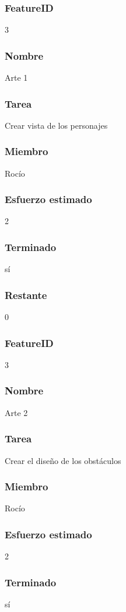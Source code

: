 \subsubsection{FeatureID} 3
\subsubsection{Nombre} Arte 1
\subsubsection{Tarea} Crear vista de los personajes
\subsubsection{Miembro} Rocío
\subsubsection{Esfuerzo estimado} 2
\subsubsection{Terminado} sí
\subsubsection{Restante} 0



\subsubsection{FeatureID} 3
\subsubsection{Nombre} Arte 2
\subsubsection{Tarea} Crear el diseño de los obstáculos
\subsubsection{Miembro} Rocío
\subsubsection{Esfuerzo estimado} 2
\subsubsection{Terminado} sí
